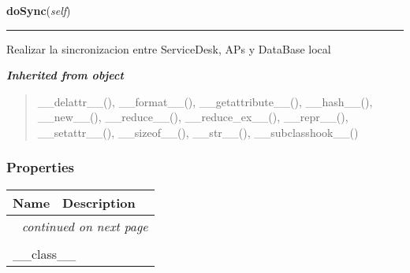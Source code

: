     \label{web2py:applications:macfilter:modules:sshToApsManager:sshToApsManager:doSync}

    \vspace{0.5ex}

\hspace{.8\funcindent}\begin{boxedminipage}{\funcwidth}

    \raggedright \textbf{doSync}(\textit{self})

    \vspace{-1.5ex}

    \rule{\textwidth}{0.5\fboxrule}
\setlength{\parskip}{2ex}
    Realizar la sincronizacion entre ServiceDesk, APs y DataBase local

\setlength{\parskip}{1ex}
    \end{boxedminipage}


\large{\textbf{\textit{Inherited from object}}}

\begin{quote}
\_\_delattr\_\_(), \_\_format\_\_(), \_\_getattribute\_\_(), \_\_hash\_\_(), \_\_new\_\_(), \_\_reduce\_\_(), \_\_reduce\_ex\_\_(), \_\_repr\_\_(), \_\_setattr\_\_(), \_\_sizeof\_\_(), \_\_str\_\_(), \_\_subclasshook\_\_()
\end{quote}


  \subsubsection{Properties}

    \vspace{-1cm}
\hspace{\varindent}\begin{longtable}{|p{\varnamewidth}|p{\vardescrwidth}|l}
\cline{1-2}
\cline{1-2} \centering \textbf{Name} & \centering \textbf{Description}& \\
\cline{1-2}
\endhead\cline{1-2}\multicolumn{3}{r}{\small\textit{continued on next page}}\\\endfoot\cline{1-2}
\endlastfoot\multicolumn{2}{|l|}{\textit{Inherited from object}}\\
\multicolumn{2}{|p{\varwidth}|}{\raggedright \_\_class\_\_}\\
\cline{1-2}
\end{longtable}

